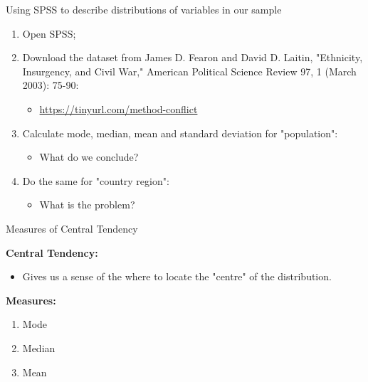 \documentclass[10pt]{beamer}   %
\begin{document}
\begin{frame}{Using SPSS to describe distributions of variables in our sample}


\begin{enumerate}
    \item Open SPSS; \pause
    \item Download the dataset from James D. Fearon and David D. Laitin, "Ethnicity, Insurgency, and Civil War," American Political Science Review 97, 1 (March 2003): 75-90: 
\begin{itemize}
 \item \url{https://tinyurl.com/method-conflict}  \pause
\end{itemize}
\item Calculate mode, median, mean and standard deviation for "population":  \pause
\begin{itemize}
\item What do we conclude?  \pause
\end{itemize}
\item Do the same for "country region": \pause
\begin{itemize}
\item What is the problem?
\end{itemize}
\end{enumerate}



\end{frame}





\begin{frame}{Measures of Central Tendency}


 \textbf{Central Tendency:}
\begin{itemize}
\item Gives us a sense of the where to locate the "centre" of the distribution.
\end{itemize}
\textbf{Measures:}
\begin{enumerate}
\item Mode
\item Median
 \item Mean 
\end{enumerate}

\end{frame}

\end{document}
